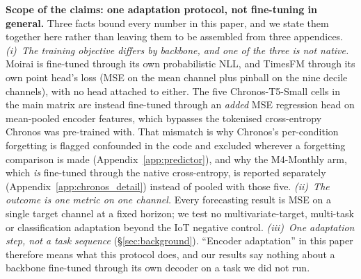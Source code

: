 \textbf{Scope of the claims: one adaptation protocol, not fine-tuning in
general.}  Three facts bound every number in this paper, and we state them
together here rather than leaving them to be assembled from three appendices.
\emph{(i)~The training objective differs by backbone, and one of the three is not
native.}  Moirai is fine-tuned through its own probabilistic NLL, and TimesFM
through its own point head's loss (MSE on the mean channel plus pinball on the
nine decile channels), with no head attached to either.  The five
Chronos-T5-Small cells in the main matrix are instead fine-tuned through an
\emph{added} MSE regression head on mean-pooled encoder features, which bypasses
the tokenised cross-entropy Chronos was pre-trained with.  That mismatch is why
Chronos's per-condition forgetting is flagged confounded in the code and excluded
wherever a forgetting comparison is made (Appendix~\ref{app:predictor}), and why
the M4-Monthly arm, which \emph{is} fine-tuned through the native cross-entropy,
is reported separately (Appendix~\ref{app:chronos_detail}) instead of pooled with
those five.  \emph{(ii)~The outcome is one metric on one channel.}  Every
forecasting result is MSE on a single target channel at a fixed horizon; we test
no multivariate-target, multi-task or classification adaptation beyond the IoT
negative control.  \emph{(iii)~One adaptation step, not a task sequence}
(\S\ref{sec:background}).  ``Encoder adaptation'' in this paper therefore means
what this protocol does, and our results say nothing about a backbone fine-tuned
through its own decoder on a task we did not run.

